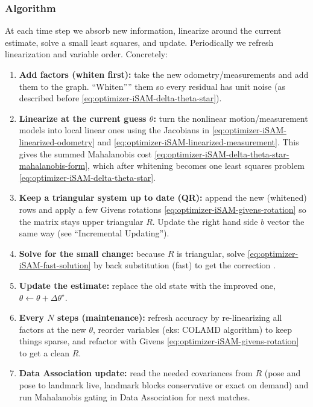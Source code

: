 \subsubsection{Algorithm}
At each time step we absorb new information, linearize around the current estimate, solve a small least squares, and update. Periodically we refresh linearization and variable order. Concretely:
\begin{enumerate}
    \item \textbf{Add factors (whiten first):} take the new odometry/measurements and add them to the graph. ``Whiten”'' them so every residual has unit noise (as described before \eqref{eq:optimizer-iSAM-delta-theta-star}).

    \item \textbf{Linearize at the current guess \(\theta\):} turn the nonlinear motion/measurement models into local linear ones using the Jacobians in
    \eqref{eq:optimizer-iSAM-linearized-odometry} and \eqref{eq:optimizer-iSAM-linearized-measurement}. This gives the summed Mahalanobis cost \eqref{eq:optimizer-iSAM-delta-theta-star-mahalanobis-form}, which after whitening becomes one least squares problem \eqref{eq:optimizer-iSAM-delta-theta-star}.

    \item \textbf{Keep a triangular system up to date (QR):} append the new (whitened) rows and apply a few Givens rotations \eqref{eq:optimizer-iSAM-givens-rotation} so the matrix stays upper triangular $R$. Update the right hand side $b$ vector the same way (see ``Incremental Updating'').

    \item \textbf{Solve for the small change:} because $R$ is triangular, solve
    \eqref{eq:optimizer-iSAM-fast-solution} by back substitution (fast) to get the correction .

    \item \textbf{Update the estimate:} replace the old state with the improved one,
    $\theta \leftarrow \theta + \Delta\theta^\star$.

    \item \textbf{Every \(N\) steps (maintenance):} refresh accuracy by re-linearizing all factors at the new $\theta$, reorder variables (eks: \gls{COLAMD} algorithm) to keep things sparse, and refactor with Givens \eqref{eq:optimizer-iSAM-givens-rotation} to get a clean $R$.

    \item \textbf{Data Association update:} read the needed covariances from $R$ (pose and pose to landmark live, landmark blocks conservative or exact on demand) and run Mahalanobis gating in Data Association for next matches.
\end{enumerate}



